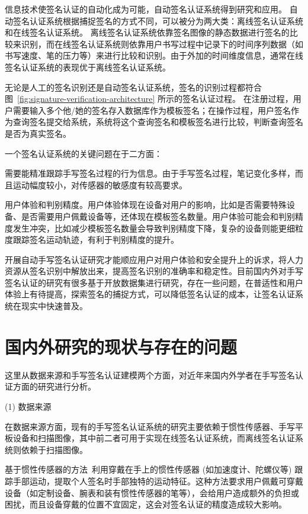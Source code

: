 信息技术使签名认证的自动化成为可能，自动签名认证系统得到研究和应用。 自动签名认证系统根据捕捉签名的方式不同，可以被分为两大类：离线签名认证系统和在线签名认证系统。 离线签名认证系统依靠签名图像的静态数据进行签名的比较来识别，而在线签名认证系统则依靠用户书写过程中记录下的时间序列数据（如书写速度、笔的压力等）来进行比较和识别。由于外加的时间维度信息，通常在线签名认证系统的表现优于离线签名认证系统。



无论是人工的签名识别还是自动签名认证系统，签名的识别过程都符合图~\ref{fig:signature-verification-architecture}
所示的签名认证过程。 在注册过程，用户需要输入多个他/她的签名存入数据库作为模板签名；在操作过程，用户签名作为查询签名提交给系统，系统将这个查询签名和模板签名进行比较，判断查询签名是否为真实签名。

一个签名认证系统的关键问题在于二方面：
\begin{enumerate*}[label=\itshape\alph*)\upshape]
    \item 需要能精准跟踪手写签名过程的行为信息。由于手写签名过程，笔记变化多样，而且运动幅度较小，对传感器的敏感度有较高要求。
    \item 用户体验和判别精度。用户体验体现在设备对用户的影响，比如是否需要特殊设备、是否需要用户佩戴设备等，还体现在模板签名数量。用户体验可能会和判别精度发生冲突，比如减少模板签名数量会导致判别精度下降，复杂的设备则能更细粒度跟踪签名运动轨迹，有利于判别精度的提升。
\end{enumerate*}

开展自动手写签名认证研究才能顺应用户对用户体验和安全提升上的诉求，将人力资源从签名识别中解放出来，提高签名识别的准确率和稳定性。目前国内外对手写签名认证的研究有很多基于开放数据集进行研究，存在一些问题，在普适性和用户体验上有待提高，探索签名的捕捉方式，可以降低签名认证的成本，让签名认证系统在现实中快速普及。

\section{国内外研究的现状与存在的问题}
这里从数据来源和手写签名认证建模两个方面，对近年来国内外学者在手写签名认证方面的研究进行分析。

(1) 数据来源

在数据来源方面，现有的手写签名认证系统的研究主要依赖于惯性传感器、手写平板设备和扫描图像，其中前二者可用于实现在线签名认证系统，而离线签名认证系统则依赖于扫描图像。

基于惯性传感器的方法~\cite{levy2018handwritten,griswold2019wearables,bunke2011online}利用穿戴在手上的惯性传感器 (如加速度计、陀螺仪等) 跟踪手部运动，提取个人签名时手部独特的运动特征。这种方法要求用户佩戴可穿戴设备（如定制设备、腕表和装有惯性传感器的笔等），会给用户造成额外的负担或困扰，而且设备穿戴的位置不宜固定，这会对签名认证的精度造成较大影响。

